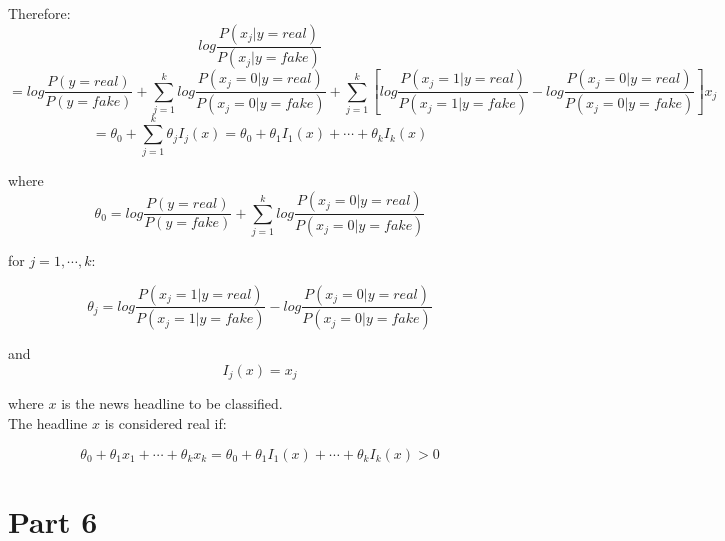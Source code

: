 \documentclass{article}
\begin{document}
\noindent
Therefore:
$$log\frac{P(x_j|y=real)}{P(x_j|y=fake)}$$
$$= log\frac{P(y=real)}{P(y=fake)} + \sum_{j=1}^{k}log\frac{P(x_j = 0|y=real)}{P(x_j = 0|y=fake)} + \sum_{j=1}^{k}[log\frac{P(x_j = 1|y=real)}{P(x_j = 1|y=fake)} - log\frac{P(x_j = 0|y=real)}{P(x_j = 0|y=fake)}]x_j$$
$$=\theta_0 + \sum_{j=1}^{k}\theta_j I_{j}(x)  = \theta_0 + \theta_1 I_{1}(x) + \cdots + \theta_k I_{k}(x)$$

\noindent
where $$\theta_0 = log\frac{P(y=real)}{P(y=fake)} + \sum_{j=1}^{k}log\frac{P(x_j = 0|y=real)}{P(x_j = 0|y=fake)}$$

for $j= 1, \cdots, k$:

$$\theta_j = log\frac{P(x_j = 1|y=real)}{P(x_j = 1|y=fake)} - log\frac{P(x_j = 0|y=real)}{P(x_j = 0|y=fake)}$$

\noindent
and
$$I_j(x) = x_j$$

\noindent
where $x$ is the news headline to be classified.\\

\noindent
The headline $x$ is considered real if:

$$\theta_0 + \theta_1 x_1 + \cdots + \theta_k x_k = \theta_0 + \theta_1 I_{1}(x) + \cdots + \theta_k I_{k}(x) > 0$$

\section*{Part 6}
\end{document}
